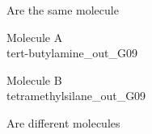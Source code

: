 \begin{center}
\vtab
\vtab
\textcolor{NavyBlue}{\Large Are the same molecule}
\end{center}
\newpage
\begin{multicols}{2}
\begin{center}
Molecule A \\ 
tert-butylamine\_out\_G09
\vtab

\columnbreak

Molecule B \\ 
tetramethylsilane\_out\_G09
\vtab
\end{center}
\end{multicols}
\begin{center}
\vtab
\vtab
\textcolor{NavyBlue}{\large Are different molecules}
\end{center}
\newpage
